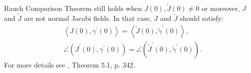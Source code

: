 \documentclass{ctexart}
\begin{document}
\begin{remark}
  Rauch Comparison Theorem still holds when $J(0),\tilde{J}(0)\neq 0$ or moreover, $J$ and $\tilde{J}$ are not normal Jacobi fields. 
  In that case, $J$ and $\tilde{J}$ should satisfy: 
  $$
  \begin{aligned}
    & \left\langle J(0), \gamma^{\prime}(0)\right\rangle=\left\langle\tilde{J}(0), \tilde{\gamma}^{\prime}(0)\right\rangle, \\
    & \angle \left(J^{\prime}(0), \gamma^{\prime}(0)\right)=\angle\left(\tilde{J}^{\prime}(0), \tilde{\gamma}^{\prime}(0)\right).
  \end{aligned}  
  $$
  For more details see \cite{ChenWeiHuan2002}, Theorem 5.1, p. 342. 
\end{remark}



\end{document}
